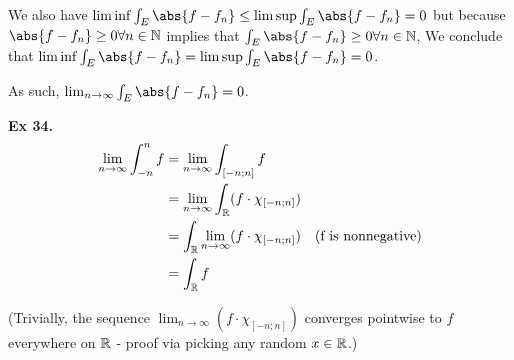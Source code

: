 \begin{enumerate}[label=(\roman*)]
    We also have $\liminf \int_E \abs{f - f_n} \leq \limsup \int_E \abs{f - f_n} = 0$ but because $\abs{f - f_n} \geq 0 \forall n\in\N$ implies that $\int_E \abs{f - f_n} \geq 0 \forall n\in\N$,
    We conclude that $\liminf \int_E \abs{f - f_n} = \limsup \int_E \abs{f - f_n} = 0$.

    As such, $\lim_{n\to\infty} \int_E \abs{f - f_n} = 0$.
\end{enumerate}


\noindent {} \textbf{Ex 34.} \label{ex:4_34}
\begin{align*}
    \lim_{n\to\infty} \int_{-n}^{n} f 
      &= \lim_{n\to\infty} \int_{[-n; n]} f
    \\&= \lim_{n\to\infty} \int_{\mathbb{R}} (f \cdot \chi_{[-n;n]})
    \\&= \int_{\mathbb{R}} \lim_{n\to\infty} (f \cdot \chi_{[-n;n]}) \quad \text{(f is nonnegative)}
    \\&= \int_{\mathbb{R}} f
\end{align*}

(Trivially, the sequence $\lim_{n\to\infty} (f \cdot \chi_{[-n;n]})$ converges pointwise to $f$ everywhere on $\mathbb{R}$ - proof via picking any random $x \in \mathbb{R}$.)
